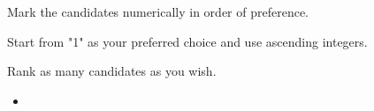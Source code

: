\documentclass[14pt,onesided]{letter}
\def\option{\item[$\vcenter{\hbox{\Huge$\Box$}}$]}
\begin{document}
    \begin{center}
        \Huge{}
        \LARGE{}


        \Large{\textbf{}}
    \end{center}

    Mark the candidates numerically in order of preference. 

    Start from "1" as your preferred choice and use ascending integers.

    Rank as many candidates as you wish.

    \begin{itemize}
            \option {}
    \end{itemize}
\end{document}

